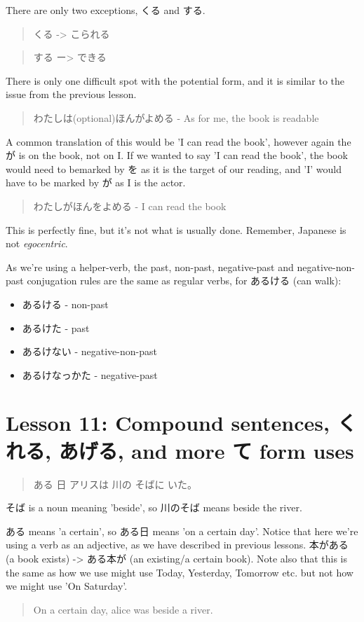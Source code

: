 \documentclass[11pt]{article}
\begin{document}
There are only two exceptions, くる and する.
\begin{quote}
くる -> こられる
\end{quote}
\begin{quote}
する ー> できる
\end{quote}

There is only one difficult spot with the potential form, and it is similar to the issue from the previous lesson.
\begin{quote}
わたしは(optional)ほんがよめる - As for me, the book is readable
\end{quote}
A common translation of this would be 'I can read the book', however again the が is on the book, not on I. If we wanted to say 'I can read the book', the book would need to bemarked by を as it is the target of our reading, and 'I' would have to be marked by が as I is the actor.
\begin{quote}
わたしがほんをよめる - I can read the book
\end{quote}
This is perfectly fine, but it's not what is usually done. Remember, Japanese is not \emph{egocentric}.

As we're using a helper-verb, the past, non-past, negative-past and negative-non-past conjugation rules are the same as regular verbs, for あるける (can walk):
\begin{itemize}
\item あるける - non-past
\item あるけた - past
\item あるけない - negative-non-past
\item あるけなっかた - negative-past
\end{itemize}
\section{Lesson 11: Compound sentences, くれる, あげる, and more て form uses}
\label{sec:org5ee2687}
\begin{quote}
ある 日 アリスは 川の そばに いた。
\end{quote}
そば is a noun meaning 'beside', so 川のそば means beside the river.

ある means 'a certain', so ある日 means 'on a certain day'. Notice that here we're using a verb as an adjective, as we have described in previous lessons. 本がある (a book exists) -> ある本が (an existing/a certain book). Note also that this is the same as how we use might use Today, Yesterday, Tomorrow etc. but not how we might use 'On Saturday'.
\begin{quote}
On a certain day, alice was beside a river.
\end{quote}
\end{document}
